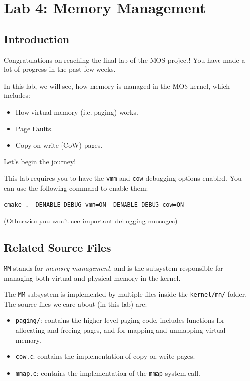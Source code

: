 \chapter{Lab 4: Memory Management}

\section{Introduction}

Congratulations on reaching the final lab of the MOS project! You have
made a lot of progress in the past few weeks.

In this lab, we will see, how memory is managed in the MOS kernel, which includes:

\begin{itemize}
    \item How virtual memory (i.e. paging) works.
    \item Page Faults.
    \item Copy-on-write (CoW) pages.
\end{itemize}

Let's begin the journey!

\begin{note}
    \item This lab requires you to have the \texttt{vmm} and \texttt{cow} debugging options
    enabled. You can use the following command to enable them:
    \begin{verbatim}
cmake . -DENABLE_DEBUG_vmm=ON -DENABLE_DEBUG_cow=ON
    \end{verbatim}
    \item (Otherwise you won't see important debugging messages)
\end{note}

\section{Related Source Files}

\texttt{MM} stands for \textit{memory management}, and is the subsystem
responsible for managing both virtual and physical memory in the kernel.

The \texttt{MM} subsystem is implemented by multiple files inside the \texttt{kernel/mm/}
folder. The source files we care about (in this lab) are:

\begin{itemize}
    \item \texttt{paging/}: contains the higher-level paging code, includes functions
          for allocating and freeing pages, and for mapping and unmapping virtual
          memory.
    \item \texttt{cow.c}: contains the implementation of copy-on-write pages.
    \item \texttt{mmap.c}: contains the implementation of the \texttt{mmap} system call.
\end{itemize}

